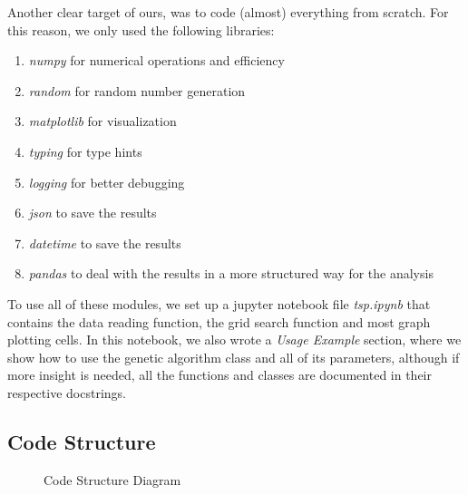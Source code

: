 \documentclass[12pt]{article}
\begin{document}
Another clear target of ours, was to code (almost) everything from scratch. For this reason, we only used the following libraries:
\begin{enumerate}
    \item \textit{numpy} for numerical operations and efficiency
    \item \textit{random} for random number generation
    \item \textit{matplotlib} for visualization
    \item \textit{typing} for type hints
    \item \textit{logging} for better debugging
    \item \textit{json} to save the results
    \item \textit{datetime} to save the results
    \item \textit{pandas} to deal with the results in a more structured way for the analysis
\end{enumerate}

To use all of these modules, we set up a jupyter notebook file \textit{tsp.ipynb} that contains the data reading function, the grid search function and most graph plotting cells. In this notebook, we also wrote a \textit{Usage Example} section, where we show how to use the genetic algorithm class and all of its parameters, although if more insight is needed, all the functions and classes are documented in their respective docstrings.

\subsection{Code Structure}

\begin{figure}
    \centering
    \caption{Code Structure Diagram}
    \label{fig:code_structure}
\end{figure}
\end{document}
